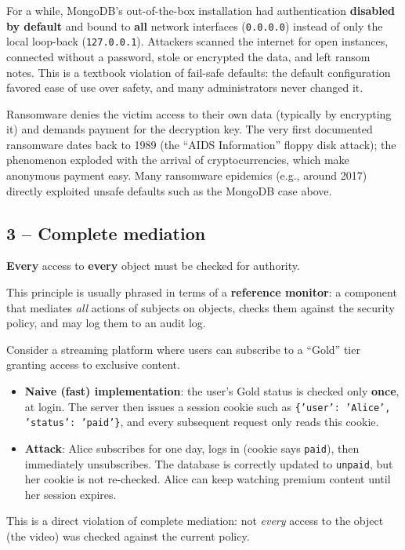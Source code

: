 \begin{example}
For a while, MongoDB's out-of-the-box installation had authentication \textbf{disabled by default} and bound to \textbf{all} network interfaces (\texttt{0.0.0.0}) instead of only the local loop-back (\texttt{127.0.0.1}). Attackers scanned the internet for open instances, connected without a password, stole or encrypted the data, and left ransom notes. This is a textbook violation of fail-safe defaults: the default configuration favored ease of use over safety, and many administrators never changed it.
\end{example}

\begin{remark}[Ransomware]
Ransomware denies the victim access to their own data (typically by encrypting it) and demands payment for the decryption key. The very first documented ransomware dates back to 1989 (the ``AIDS Information'' floppy disk attack); the phenomenon exploded with the arrival of cryptocurrencies, which make anonymous payment easy. Many ransomware epidemics (e.g., around 2017) directly exploited unsafe defaults such as the MongoDB case above.
\end{remark}

\subsection{3 -- Complete mediation}

\begin{definition}
\textbf{Every} access to \textbf{every} object must be checked for authority.
\end{definition}

This principle is usually phrased in terms of a \textbf{reference monitor}: a component that mediates \emph{all} actions of subjects on objects, checks them against the security policy, and may log them to an audit log.

\begin{example}
Consider a streaming platform where users can subscribe to a ``Gold'' tier granting access to exclusive content.
\begin{itemize}
    \item \textbf{Naive (fast) implementation}: the user's Gold status is checked only \textbf{once}, at login. The server then issues a session cookie such as \texttt{\{'user': 'Alice', 'status': 'paid'\}}, and every subsequent request only reads this cookie.
    \item \textbf{Attack}: Alice subscribes for one day, logs in (cookie says \texttt{paid}), then immediately unsubscribes. The database is correctly updated to \texttt{unpaid}, but her cookie is not re-checked. Alice can keep watching premium content until her session expires.
\end{itemize}
This is a direct violation of complete mediation: not \emph{every} access to the object (the video) was checked against the current policy.
\end{example}

